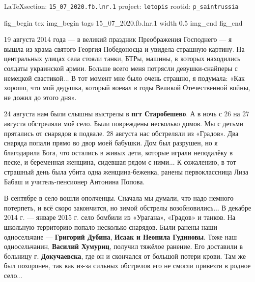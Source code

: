 \documentclass[a4paper,11pt]{extreport}
\makeatletter
\newcommand{\rindex}[2][\imki@jobname]{%
	  \index[#1]{\detokenize{#2}}%
	}
\def\city#1{{\bfseries\color{red} #1}}
\def\name#1{{\bfseries\color{blue} #1}}
\makeatother
\begin{document}
\cite{15_07_2020.fb.lnr.1}

\vspace{0.5cm}
{\ifDEBUG\small\LaTeX section: \verb|15_07_2020.fb.lnr.1| project: \verb|letopis| rootid: \verb|p_saintrussia|\fi}
\vspace{0.5cm}

\ifcmt
fig_begin 
	tex \centering
  img_begin 
    tags 15_07_2020.fb.lnr.1
    width 0.5
  img_end
fig_end
\fi



19 августа 2014 года --- в великий праздник Преображения Господнего --- я вышла из
храма святого Георгия Победоносца и увидела страшную картину. На центральных
улицах села стояли танки, БТРы, машины, в которых находились солдаты украинской
армии. Больше всего меня потрясли девушки-снайперы с немецкой свастикой... В
тот момент мне было очень страшно, я подумала: «Как хорошо, что мой дедушка,
который воевал в годы Великой Отечественной войны, не дожил до этого дня».

24 августа нам были слышны выстрелы в \city{пгт Старобешево}. А в ночь с 26 на 27
августа обстреляли моё село. Были повреждены несколько домов. Мы с детьми
прятались от снарядов в подвале. 28 августа нас обстреляли из «Градов». Два
снаряда попали прямо во двор моей бабушки. Дом был разрушен, но я благодарила
Бога, что остались в живых дети, которые играли неподалёку в песке, и
беременная женщина, сидевшая рядом с ними$\ldots$ К сожалению, в тот страшный день
была убита одна женщина-беженка, ранены первоклассница Лиза Бабаш и
учитель-пенсионер Антонина Попова.


В сентябре в село вошли ополченцы. Сначала мы думали, что надо немного
потерпеть, и всё скоро закончится, но зимой обстрелы возобновились$\ldots$ В декабре
2014 г. --- январе 2015 г. село бомбили из «Урагана», «Градов» и танков. На
школьную территорию попало несколько снарядов. Были ранены наши односельчане ---
\name{Григорий Дубина}, \name{Исаак и Неонила Гудиновы}. Тоже наш односельчанин, 
\name{Василий Хумуриц}, получил тяжёлое ранение. Его доставили в больницу г. \city{Докучаевска}, где
он и скончался от большой потери крови. Там же был похоронен, так как из-за
сильных обстрелов его не смогли привезти в родное село...
\end{document}
